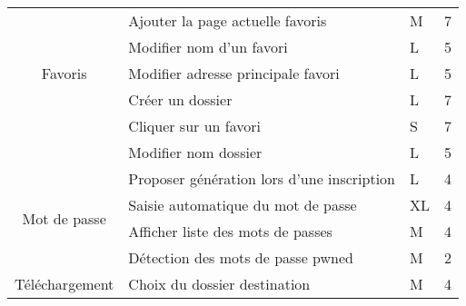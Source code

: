 \documentclass[10pt,a4paper]{article}
\begin{document}
\begin{table}[H]
\begin{tabular}{|c|l|l|l|}
\multirow{5}{*}{Favoris}                & Ajouter la page actuelle favoris             & M                                            & 7                                           \\ \cline{2-4} 
                                        & Modifier nom d'un favori                         & L                                            & 5                                           \\ \cline{2-4} 
                                        & Modifier adresse principale favori                     & L                                            & 5                                           \\ \cline{2-4} 
                                        & Créer un dossier                             & L                                            & 7                                           \\ \cline{2-4}
                                        & Cliquer sur un favori                             & S                                            & 7                                           \\ \cline{2-4} 
                                        & Modifier nom dossier                         & L                                            & 5                                           \\ \hline
\multirow{4}{*}{Mot de passe}           & Proposer génération lors d'une inscription   & L                                            & 4                                           \\ \cline{2-4} 
                                        & Saisie automatique du mot de passe           & XL                                           & 4                                           \\ \cline{2-4} 
                                        & Afficher liste des mots de passes            & M                                            & 4                                           \\ \cline{2-4} 
                                        & Détection des mots de passe pwned            & M                                            & 2                                           \\ \hline
\multirow{3}{*}{Téléchargement}         & Choix du dossier destination                 & M                                            & 4                                           \\ \cline{2-4} 

\end{tabular}
\end{table}
\end{document}
